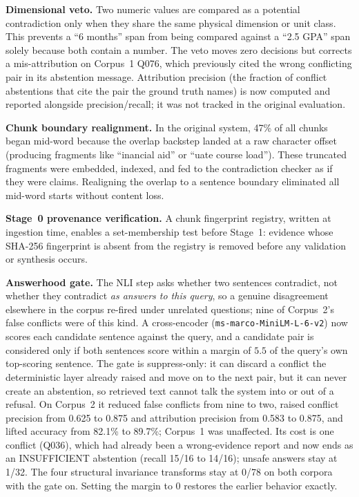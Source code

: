 \documentclass[conference]{IEEEtran}
\begin{document}
\textbf{Dimensional veto.}
Two numeric values are compared as a potential contradiction only when
they share the same physical dimension or unit class. This prevents a
``6 months'' span from being compared against a ``2.5 GPA'' span solely
because both contain a number. The veto moves zero decisions but corrects
a mis-attribution on Corpus~1 Q076, which previously cited the wrong
conflicting pair in its abstention message. Attribution precision
(the fraction of conflict abstentions that cite the pair the ground
truth names) is now computed and reported alongside precision/recall;
it was not tracked in the original evaluation.


\textbf{Chunk boundary realignment.} In the original system, 47\% of
all chunks began mid-word because the overlap backstep landed at a raw
character offset (producing fragments like ``inancial aid'' or ``uate
course load''). These truncated fragments were embedded, indexed, and
fed to the contradiction checker as if they were claims. Realigning the
overlap to a sentence boundary eliminated all mid-word starts without
content loss.

\textbf{Stage~0 provenance verification.} A chunk fingerprint registry,
written at ingestion time, enables a set-membership test before Stage~1:
evidence whose SHA-256 fingerprint is absent from the registry is
removed before any validation or synthesis occurs.

\textbf{Answerhood gate.} The NLI step asks whether two sentences
contradict, not whether they contradict \textit{as answers to this query},
so a genuine disagreement elsewhere in the corpus re-fired under unrelated
questions; nine of Corpus~2's false conflicts were of this kind. A
cross-encoder (\texttt{ms-marco-MiniLM-L-6-v2}) now scores each candidate
sentence against the query, and a candidate pair is considered only if both
sentences score within a margin of $5.5$ of the query's own top-scoring
sentence. The gate is suppress-only: it can discard a conflict the
deterministic layer already raised and move on to the next pair, but it can
never create an abstention, so retrieved text cannot talk the system into or
out of a refusal. On Corpus~2 it reduced false conflicts from nine to two,
raised conflict precision from 0.625 to 0.875 and attribution precision from
0.583 to 0.875, and lifted accuracy from 82.1\% to 89.7\%; Corpus~1 was
unaffected. Its cost is one conflict (Q036), which had already been a
wrong-evidence report and now ends as an INSUFFICIENT abstention (recall 15/16
to 14/16); unsafe answers stay at 1/32. The four structural invariance
transforms stay at 0/78 on both corpora with the gate on. Setting the margin
to $0$ restores the earlier behavior exactly.
\end{document}
